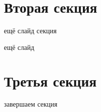 \documentclass[14pt, aspectratio=43]{beamer}
\begin{document}
    \section{Вторая секция}
    \begin{frame}{ещё слайд}
         секция
    \end{frame}
    \begin{frame}{ещё слайд}
         
    \end{frame}
    \section{Третья секция}  %
    \begin{frame}[t]{завершаем}
         секция
    \end{frame}
    
\end{document}
